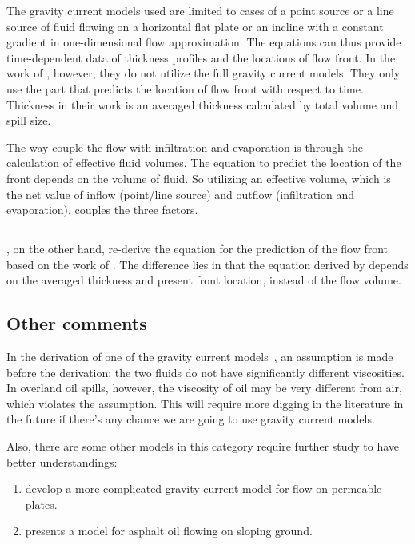 \documentclass[letterpaper]{article}
\begin{document}
The gravity current models used are limited to cases of a point source or a line 
source of fluid flowing on a horizontal flat plate or an incline with a constant 
gradient in one-dimensional flow approximation.
The equations can thus provide time-dependent data of thickness profiles and
the locations of flow front. 
In the work of \textcite{Hussein2002}, however, they do not utilize the full 
gravity current models.
They only use the part that predicts the location of flow front with respect
to time. 
Thickness in their work is an averaged thickness calculated by total volume
and spill size.

The way \textcite{Hussein2002} couple the flow with infiltration and evaporation
is through the calculation of effective fluid volumes. The equation to predict
the location of the front depends on the volume of fluid. So utilizing an
effective volume, which is the net value of inflow (point/line source) and
outflow (infiltration and evaporation), couples the three factors.

\subsection{\textcite{Simmons2003}}

\textcite{Simmons2003}, on the other hand, re-derive the equation for the 
prediction of the flow front based on the work of \textcite{Hussein2002}. 
The difference lies in that the equation derived by \textcite{Simmons2003} 
depends on the averaged thickness and present front location, instead of the
flow volume.

\subsection{Other comments}

In the derivation of one of the gravity current models\ \cite{Huppert1982}, an
assumption is made before the derivation: the two fluids do not have 
significantly different viscosities. 
In overland oil spills, however, the viscosity of oil may be very different from 
air, which violates the assumption.
This will require more digging in the literature in the future if there's any 
chance we are going to use gravity current models.

Also, there are some other models in this category require further study to 
have better understandings:

\begin{enumerate}[noitemsep]
    \item \textcite{Acton2001} develop a more complicated gravity current model
        for flow on permeable plates.
    \item \textcite{Guo2006} presents a model for asphalt oil flowing on  
        sloping ground.
\end{enumerate}
\end{document}

